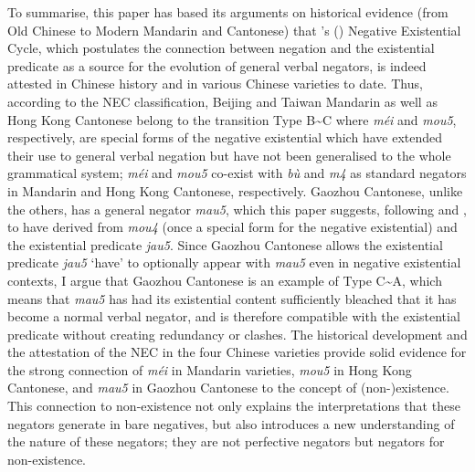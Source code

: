\documentclass[output=paper]{langscibook}
\begin{document}
To summarise, this paper has based its arguments on historical evidence (from Old Chinese to Modern Mandarin and Cantonese) that \citeauthor{Croft1991}'s (\citeyear{Croft1991}) Negative Existential Cycle, which postulates the connection between negation and the existential predicate as a source for the evolution of general verbal negators, is indeed attested in Chinese history and in various Chinese varieties to date. Thus, according to the NEC classification, Beijing and Taiwan Mandarin as well as Hong Kong Cantonese belong to the transition Type B\sim C where \textit{méi} and \textit{mou5}, respectively, are special forms of the negative existential which have extended their use to general verbal negation but have not been generalised to the whole grammatical system; \textit{méi} and \textit{mou5} co-exist with \textit{bù} and \textit{m4} as standard negators in Mandarin and Hong Kong Cantonese, respectively. Gaozhou Cantonese, unlike the others, has a general negator \textit{mau5}, which this paper suggests, following \cite{Zhang2002} and \cite{Law2014}, to have derived from \textit{mou4} (once a special form for the negative existential) and the existential predicate \textit{jau5}. Since Gaozhou Cantonese allows the existential predicate \textit{jau5} `have' to optionally appear with \textit{mau5} even in negative existential contexts, I argue that Gaozhou Cantonese is an example of Type C\sim A, which means that \textit{mau5} has had its existential content sufficiently bleached that it has become a normal verbal negator, and is therefore compatible with the existential predicate without creating redundancy or clashes. The historical development and the attestation of the NEC in the four Chinese varieties provide solid evidence for the strong connection of \textit{méi} in Mandarin varieties, \textit{mou5} in Hong Kong Cantonese, and \textit{mau5} in Gaozhou Cantonese to the concept of (non-)existence. This connection to non-existence not only explains the interpretations that these negators generate in bare negatives, but also introduces a new understanding of the nature of these negators; they are not perfective negators but negators for non-existence. 

 
 
\end{document}
